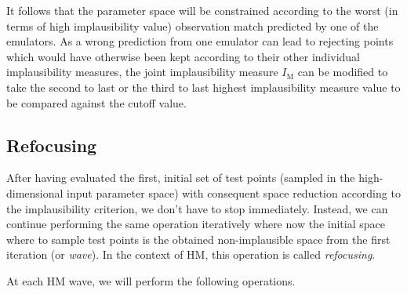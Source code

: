 \noindent
It follows that the parameter space will be constrained according to the worst (in terms of high implausibility value) observation match predicted by one of the emulators. As a wrong prediction from one emulator can lead to rejecting points which would have otherwise been kept according to their other individual implausibility measures, the joint implausibility measure $I_{\text{M}}$ can be modified to take the second to last or the third to last highest implausibility measure value to be compared against the cutoff value.


%
%
%
\subsection{Refocusing}\label{sec:ch3refocusing}
After having evaluated the first, initial set of test points (sampled in the high-dimensional input parameter space) with consequent space reduction according to the implausibility criterion, we don't have to stop immediately. Instead, we can continue performing the same operation iteratively where now the initial space where to sample test points is the obtained non-implausible space from the first iteration (or \textit{wave}). In the context of HM, this operation is called \textit{refocusing}.

\vspace{0.2cm}\noindent
At each HM wave, we will perform the following operations.

